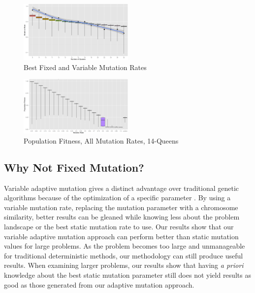 \documentclass[conference]{IEEEtran}
\begin{document}
\begin{figure}
\centering
\includegraphics[width=0.50\textwidth]{mutation_rate_all_queens.png}
\vspace{-18pt}
\caption{Best Fixed and Variable Mutation Rates}
\label{fig:mutation_rate_all_queens}
\end{figure}

\begin{figure}
\centering
\includegraphics[width=0.50\textwidth]{fitness_all_mutation_14q.png}
\vspace{-18pt}
\caption{Population Fitness, All Mutation Rates, 14-Queens}
\label{fig:fitness_all_mutation_14}
\end{figure}



\subsection{Why Not Fixed Mutation?}
Variable adaptive mutation gives a distinct advantage over traditional genetic algorithms because of the optimization of a specific parameter \cite{hesser1991towards,ye2010some}. By using a variable mutation rate, replacing the mutation parameter with a chromosome similarity, better results can be gleaned while knowing less about the problem landscape or the best static mutation rate to use. Our results show that our variable adaptive mutation approach can perform better than static mutation values for large problems. As the problem becomes too large and unmanageable for traditional deterministic methods, our methodology can still produce useful results. When examining larger problems, our results show that having \emph{a priori} knowledge about the best static mutation parameter still does not yield results as good as those generated from our adaptive mutation approach.
\end{document}
